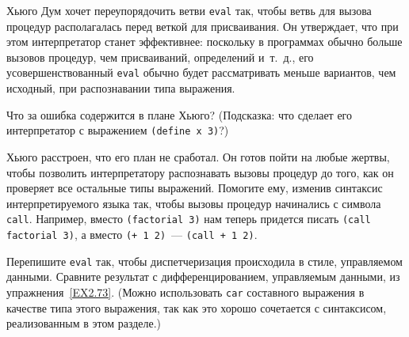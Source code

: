 \begin{exercise}{4.2}%
\label{EX4.2}%
Хьюго Дум хочет переупорядочить ветви
{\tt eval} так, чтобы ветвь для вызова процедур располагалась
перед веткой для присваивания. Он утверждает, что при этом интерпретатор
станет эффективнее: поскольку в программах обычно больше вызовов
процедур, чем присваиваний, определений и~т.~д., его усовершенствованный
{\tt eval} обычно будет рассматривать меньше вариантов, чем
исходный, при распознавании типа выражения.
 
\begin{plainenum}
\item
Что за ошибка содержится в плане Хьюго? (Подсказка:
что сделает его интерпретатор с выражением {\tt (define x 3)}?)

\item
{}Хьюго расстроен, что его план не 
сработал.  Он готов пойти на любые жертвы, чтобы позволить интерпретатору
распознавать вызовы процедур до того, как он проверяет все остальные
типы выражений.  Помогите ему, изменив синтаксис интерпретируемого
языка так, чтобы вызовы процедур начинались с символа
{\tt call}.  Например, вместо {\tt (factorial 3)} нам
теперь придется писать {\tt (call factorial 3)}, а вместо
{\tt (+ 1 2)}~--- {\tt (call + 1 2)}.
\end{plainenum}
\end{exercise}

\begin{exercise}{4.3}%
\label{EX4.3}%
Перепишите {\tt eval}
так, чтобы 
диспетчеризация происходила в стиле, управляемом данными.
Сравните результат с 
дифференцированием, управляемым данными, из 
упражнения~\ref{EX2.73}. (Можно использовать {\tt car}
составного выражения в качестве типа этого выражения, так как это
хорошо сочетается с синтаксисом, реализованным в этом разделе.)
\end{exercise}

